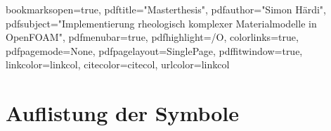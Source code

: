 

\hypersetup
{
bookmarksopen=true,
pdftitle="Masterthesis",
pdfauthor="Simon Härdi",
pdfsubject="Implementierung rheologisch komplexer Materialmodelle in OpenFOAM", %
pdfmenubar=true, %
pdfhighlight=/O, %
colorlinks=true,
pdfpagemode=None,
pdfpagelayout=SinglePage,
pdffitwindow=true,
linkcolor=linkcol,
citecolor=citecol,
urlcolor=linkcol
}


%
%

\frontmatter





\newpage
\tableofcontents
\newpage
\section*{Auflistung der Symbole\hfill}%
\listofsymbols

\mainmatter







%

\backmatter
%
%





